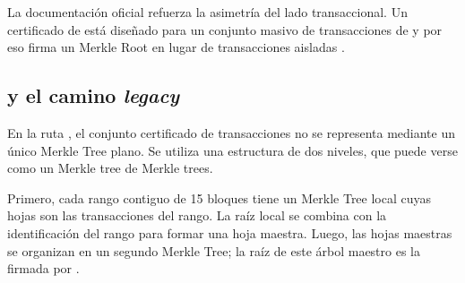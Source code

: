 La documentación oficial refuerza la asimetría del lado transaccional. Un certificado de \CardanoTransactions está diseñado para un conjunto masivo de transacciones de \Cardano y por eso firma un Merkle Root en lugar de transacciones aisladas \cite{MithrilDocsTransactions}.

\subsection{\Pythagoras y el camino \textit{legacy}}
\label{subsec:artefactos-certificados-y-versiones-pythagoras-y-el-camino-legacy}

En la ruta \Pythagoras, el conjunto certificado de transacciones no se representa mediante un único Merkle Tree plano. Se utiliza una estructura de dos niveles, que puede verse como un Merkle tree de Merkle trees.

Primero, cada rango contiguo de 15 bloques tiene un Merkle Tree local cuyas hojas son las transacciones del rango. La raíz local se combina con la identificación del rango para formar una hoja maestra. Luego, las hojas maestras se organizan en un segundo Merkle Tree; la raíz de este árbol maestro es la \TxSetRoot firmada por \Mithril.

